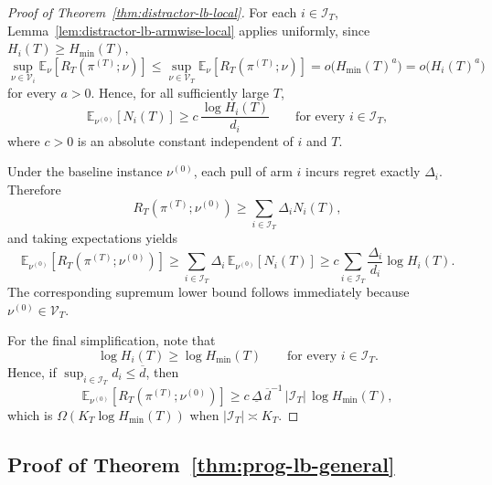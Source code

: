 \documentclass[
  12pt]{article}
\begin{document}
\begin{proof}[Proof of Theorem~\ref{thm:distractor-lb-local}]
For each $i\in\mathcal I_T$, Lemma~\ref{lem:distractor-lb-armwise-local}
applies uniformly, since $H_i(T)\ge H_{\min}(T),$
\[
\sup_{\nu\in\mathcal V_i}\mathbb E_\nu[R_T(\pi^{(T)};\nu)]
\le
\sup_{\nu\in\mathcal V_T}\mathbb E_\nu[R_T(\pi^{(T)};\nu)]
=
o\bigl(H_{\min}(T)^a\bigr)
=
o\bigl(H_i(T)^a\bigr)
\]
for every $a>0$. Hence, for all sufficiently large $T$,
\[
\mathbb E_{\nu^{(0)}}[N_i(T)]
\ge
c\,\frac{\log H_i(T)}{d_i}
\qquad
\text{for every }i\in\mathcal I_T,
\]
where $c>0$ is an absolute constant independent of $i$ and $T$.

Under the baseline instance $\nu^{(0)}$, each pull of arm $i$ incurs regret
exactly $\Delta_i$. Therefore
\[
R_T(\pi^{(T)};\nu^{(0)})
\ge
\sum_{i\in\mathcal I_T}\Delta_i N_i(T),
\]
and taking expectations yields
\[
\mathbb E_{\nu^{(0)}}[R_T(\pi^{(T)};\nu^{(0)})]
\ge
\sum_{i\in\mathcal I_T}\Delta_i\,\mathbb E_{\nu^{(0)}}[N_i(T)]
\ge
c\sum_{i\in\mathcal I_T}\frac{\Delta_i}{d_i}\log H_i(T).
\]
The corresponding supremum lower bound follows immediately because
$\nu^{(0)}\in\mathcal V_T$.

For the final simplification, note that
\[
\log H_i(T)\ge \log H_{\min}(T)
\qquad
\text{for every }i\in\mathcal I_T.
\]
Hence, if $\sup_{i\in\mathcal I_T}d_i\le \overline d$, then
\[
\mathbb E_{\nu^{(0)}}[R_T(\pi^{(T)};\nu^{(0)})]
\ge
c\,\underline\Delta\,\overline d^{-1}\,|\mathcal I_T|\,\log H_{\min}(T),
\]
which is $\Omega(K_T\log H_{\min}(T))$ when
$|\mathcal I_T|\asymp K_T$.
\end{proof}

\subsection{Proof of Theorem~\ref{thm:prog-lb-general}}
\label{sec:Proof of thm:prog-lb-general}
\end{document}
